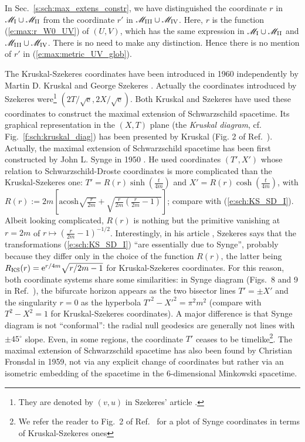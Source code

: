 \begin{remark}
In Sec.~\ref{s:sch:max_extens_constr}, we have distinguished the
coordinate
$r$ in $\mathscr{M}_{\rm I}\cup \mathscr{M}_{\rm II}$ from the coordinate $r'$ in
$\mathscr{M}_{\rm III}\cup \mathscr{M}_{\rm IV}$. Here, $r$ is the function
(\ref{e:max:r_W0_UV}) of $(U,V)$, which has the same expression in
$\mathscr{M}_{\rm I}\cup \mathscr{M}_{\rm II}$ and $\mathscr{M}_{\rm III}\cup \mathscr{M}_{\rm IV}$. There is
no need to make any distinction. Hence there is no mention of $r'$
in (\ref{e:max:metric_UV_glob}).
\end{remark}


\begin{hist}
\label{n:max:KS_coord}
The Kruskal-Szekeres coordinates have been introduced in 1960 independently
by Martin D. Kruskal \cite{Krusk60} and George Szekeres \cite{Szeke60}.
Actually the coordinates
introduced by Szekeres were\footnote{They are denoted by $(v,u)$ in Szekeres' article \cite{Szeke60}.} $(2T/\sqrt{\mathrm{e}}, 2X/\sqrt{\mathrm{e}})$. Both Kruskal and Szekeres
have used these coordinates to construct the maximal  extension of Schwarzschild
spacetime. Its graphical representation in the $(X,T)$ plane (the
\emph{Kruskal diagram}, cf. Fig.~\ref{f:sch:kruskal_diag}) has been presented by
Kruskal (Fig. 2 of Ref.~\cite{Krusk60}).
Actually, the maximal extension of Schwarzschild spacetime has been first constructed
by John L. Synge in 1950 \cite{Synge50}. He used coordinates
$(T',X')$
whose relation to
Schwarzschild-Droste coordinates is more complicated than the Kruskal-Szekeres one:
$T' = R(r) \sinh \left(\frac{t}{4m}\right)$
and $X' = R(r) \cosh \left(\frac{t}{4m}\right)$, with
$R(r) := 2m \left[ \mathrm{acosh}\sqrt{\frac{r}{2m}} + \sqrt{ \frac{r}{2m}\left(\frac{r}{2m} - 1 \right) }\right]$; compare with (\ref{e:sch:KS_SD_I}).
Albeit looking complicated, $R(r)$ is nothing but the primitive vanishing at
$r=2m$ of $r\mapsto \left(\frac{r}{2m} - 1 \right) ^{-1/2}$.
Interestingly, in his
article \cite{Szeke60}, Szekeres says that the transformations (\ref{e:sch:KS_SD_I})
``are essentially due to Synge'', probably because they differ only in the choice
of the function $R(r)$, the latter being
$R_{\rm KS}(r) = \mathrm{e}^{r/4m} \sqrt{r/2m-1}$ for Kruskal-Szekeres coordinates.
For this reason, both coordinate systems share some similarities: in Synge diagram (Figs.~8 and 9 in Ref.~\cite{Synge50}),
the bifurcate horizon appears as the two bisector lines $T' = \pm X'$ and
the singularity $r=0$ as the hyperbola $T'^2 - X'^2 = \pi^2 m^2$ (compare with
$T^2-X^2 = 1$ for Kruskal-Szekeres coordinates). A major difference is that
Synge diagram is not ``conformal'': the radial null geodesics are generally not
lines with $\pm 45^\circ$ slope. Even, in some regions, the coordinate $T'$
ceases to be timelike\footnote{We refer the reader to Fig.~2 of Ref.~\cite{Unruh14}
for a plot of Synge coordinates in terms of Kruskal-Szekeres ones}.
The maximal extension of Schwarzschild spacetime
has also been found by Christian Fronsdal \cite{Frons59} in 1959, not via any explicit change of coordinates but rather via
an isometric embedding of the spacetime in the 6-dimensional Minkowski spacetime.
\end{hist}


